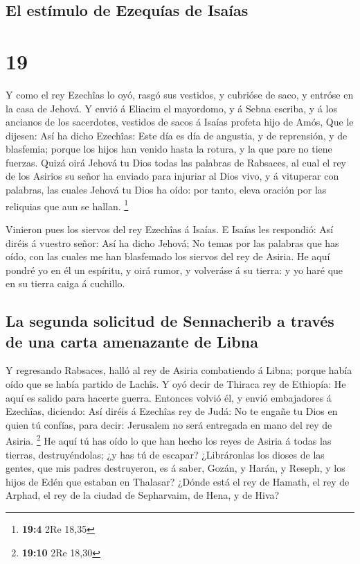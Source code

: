 \hypertarget{el-estuxedmulo-de-ezequuxedas-de-isauxedas}{%
\subsection{El estímulo de Ezequías de
Isaías}\label{el-estuxedmulo-de-ezequuxedas-de-isauxedas}}

\hypertarget{section-18}{%
\section{19}\label{section-18}}

 Y como el rey Ezechîas lo oyó, rasgó sus vestidos, y
cubrióse de saco, y entróse en la casa de Jehová.  Y envió á
Eliacim el mayordomo, y á Sebna escriba, y á los ancianos de los
sacerdotes, vestidos de sacos á Isaías profeta hijo de Amós,
 Que le dijesen: Así ha dicho Ezechîas: Este día es día de
angustia, y de reprensión, y de blasfemia; porque los hijos han venido
hasta la rotura, y la que pare no tiene fuerzas.  Quizá oirá
Jehová tu Dios todas las palabras de Rabsaces, al cual el rey de los
Asirios su señor ha enviado para injuriar al Dios vivo, y á vituperar
con palabras, las cuales Jehová tu Dios ha oído: por tanto, eleva
oración por las reliquias que aun se hallan. \footnote{\textbf{19:4} 2Re
  18,35}

 Vinieron pues los siervos del rey Ezechîas á Isaías.
 E Isaías les respondió: Así diréis á vuestro señor: Así ha
dicho Jehová; No temas por las palabras que has oído, con las cuales me
han blasfemado los siervos del rey de Asiria.  He aquí
pondré yo en él un espíritu, y oirá rumor, y volveráse á su tierra: y yo
haré que en su tierra caiga á cuchillo.

\hypertarget{la-segunda-solicitud-de-sennacherib-a-travuxe9s-de-una-carta-amenazante-de-libna}{%
\subsection{La segunda solicitud de Sennacherib a través de una carta
amenazante de
Libna}\label{la-segunda-solicitud-de-sennacherib-a-travuxe9s-de-una-carta-amenazante-de-libna}}

 Y regresando Rabsaces, halló al rey de Asiria combatiendo á
Libna; porque había oído que se había partido de Lachîs.  Y
oyó decir de Thiraca rey de Ethiopía: He aquí es salido para hacerte
guerra. Entonces volvió él, y envió embajadores á Ezechîas, diciendo:
 Así diréis á Ezechîas rey de Judá: No te engañe tu Dios en
quien tú confías, para decir: Jerusalem no será entregada en mano del
rey de Asiria. \footnote{\textbf{19:10} 2Re 18,30}  He aquí
tú has oído lo que han hecho los reyes de Asiria á todas las tierras,
destruyéndolas; ¿y has tú de escapar?  ¿Libráronlas los
dioses de las gentes, que mis padres destruyeron, es á saber, Gozán, y
Harán, y Reseph, y los hijos de Edén que estaban en Thalasar?
 ¿Dónde está el rey de Hamath, el rey de Arphad, el rey de
la ciudad de Sepharvaim, de Hena, y de Hiva?

